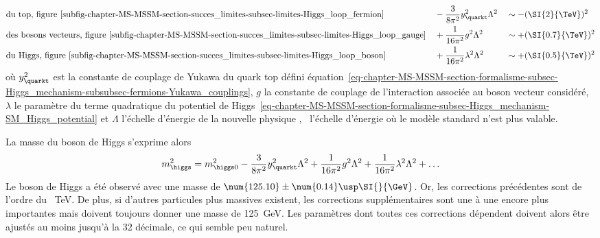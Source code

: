 \begin{align}
\allowdisplaybreaks
& \text{du top, figure~\ref{subfig-chapter-MS-MSSM-section-succes_limites-subsec-limites-Higgs_loop_fermion}} && -\frac{3}{8\pi^2} y_{\quarkt}^2 \Lambda^2 && \sim -(\SI{2}{\TeV})^2 \\
& \text{des bosons vecteurs, figure~\ref{subfig-chapter-MS-MSSM-section-succes_limites-subsec-limites-Higgs_loop_gauge}} && +\frac{1}{16\pi^2} g^2 \Lambda^2 && \sim +(\SI{0.7}{\TeV})^2 \\
& \text{du Higgs, figure~\ref{subfig-chapter-MS-MSSM-section-succes_limites-subsec-limites-Higgs_loop_boson}} && +\frac{1}{16\pi^2} \lambda^2 \Lambda^2 && \sim +(\SI{0.5}{\TeV})^2
\end{align}
où
$y_{\quarkt}^2$ est la constante de couplage de Yukawa du quark top défini équation~\eqref{eq-chapter-MS-MSSM-section-formalisme-subsec-Higgs_mechanism-subsubsec-fermions-Yukawa_couplings},
$g$ la constante de couplage de l'interaction associée au boson vecteur considéré,
$\lambda$ le paramètre du terme quadratique du potentiel de Higgs~\eqref{eq-chapter-MS-MSSM-section-formalisme-subsec-Higgs_mechanism-SM_Higgs_potential} et
$\Lambda$ l'échelle d'énergie de la \og nouvelle physique \fg, \ie\ l'échelle d'énergie où le modèle standard n'est plus valable.
\par La masse du boson de Higgs s'exprime alors
\begin{equation}
m_{\higgs}^2 = m_{\higgs 0}^2 -\frac{3}{8\pi^2} y_{\quarkt}^2 \Lambda^2  +\frac{1}{16\pi^2} g^2 \Lambda^2 + \frac{1}{16\pi^2} \lambda^2 \Lambda^2 + \ldots
\end{equation}
Le boson de Higgs a été observé avec une masse de $\num{125.10}\pm\num{0.14}\usp\SI{}{\GeV}$.
Or, les corrections précédentes sont de l'ordre du \SI{}{\TeV}.
De plus, si d'autres particules plus massives existent, les corrections supplémentaires sont une à une encore plus importantes mais doivent toujours donner une masse de \SI{125}{\GeV}.
Les paramètres dont toutes ces corrections dépendent doivent alors être ajustés au moins jusqu'à la 32 décimale, ce qui semble peu naturel.
